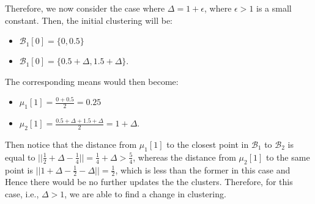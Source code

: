 \documentclass{article}
\begin{document}
    Therefore, we now consider the case where $\Delta = 1+\epsilon$, where
    $\epsilon>1$ is a small constant. Then, the initial clustering will be:
    \begin{itemize}
        \item $\mathcal{B}_1[0] = \{0, 0.5\}$
        \item $\mathcal{B}_1[0] = \{0.5+\Delta, 1.5+\Delta\}$.
    \end{itemize}
    The corresponding means would then become:
    \begin{itemize}
        \item $\mu_1[1] = \frac{0+0.5}{2} = 0.25$
        \item $\mu_2[1] = \frac{0.5+\Delta+1.5+\Delta}{2} = 1+\Delta$.
    \end{itemize}
    Then notice that the distance from $\mu_1[1]$ to the closest point in 
    $\mathcal{B}_1$ to $\mathcal{B}_2$ is equal to $||\frac{1}{2}+\Delta-
    \frac{1}{4}|| = \frac{1}{4}+\Delta > \frac{5}{4}$, whereas the distance 
    from $\mu_2[1]$ to the same point is $||1+\Delta - \frac{1}{2}-\Delta|| = 
    \frac{1}{2}$, which is less than the former in this case and Hence
    there would be no further updates the the clusters. Therefore, for this 
    case, i.e., $\Delta>1$, we are able to find a change in clustering.
\end{document}
